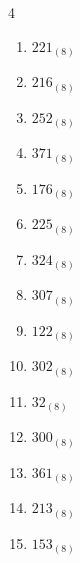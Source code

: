 \begin{multicols}{4}
\begin{enumerate}
        \phantom{$=176$}

  \item $221_{(8)}$

        \phantom{$=145$}

  \item $216_{(8)}$

        \phantom{$=142$}

\columnbreak %

  \item $252_{(8)}$

        \phantom{$=170$}

  \item $371_{(8)}$

        \phantom{$=249$}

  \item $176_{(8)}$

        \phantom{$=126$}

  \item $225_{(8)}$

        \phantom{$=149$}

  \item $324_{(8)}$

        \phantom{$=212$}

  \item $307_{(8)}$

        \phantom{$=199$}

  \item $122_{(8)}$

        \phantom{$=82$}

  \item $302_{(8)}$

        \phantom{$=194$}

  \item $32_{(8)}$

        \phantom{$=26$}

  \item $300_{(8)}$

        \phantom{$=192$}

  \item $361_{(8)}$

        \phantom{$=241$}

  \item $213_{(8)}$

        \phantom{$=139$}

  \item $153_{(8)}$

        \phantom{$=107$}


\end{enumerate}
\end{multicols}
